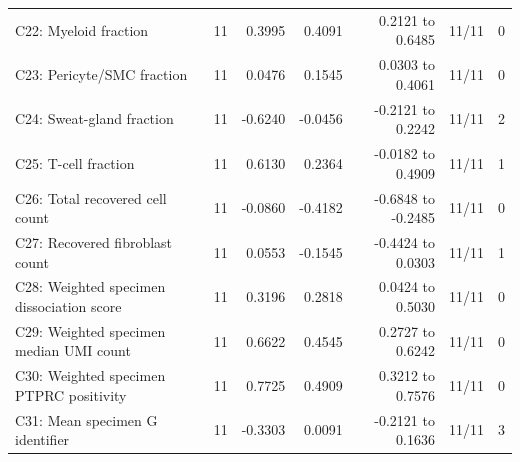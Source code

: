 \documentclass[10pt,a4paper]{article}
\begin{document}
{{\begin{longtable}{@{}p{.29\linewidth}rrrrrr@{}}
C22: Myeloid fraction & 11 & 0.3995 & 0.4091 & 0.2121 to 0.6485 & 11/11 & 0 \\
C23: Pericyte/SMC fraction & 11 & 0.0476 & 0.1545 & 0.0303 to 0.4061 & 11/11 & 0 \\
C24: Sweat-gland fraction & 11 & -0.6240 & -0.0456 & -0.2121 to 0.2242 & 11/11 & 2 \\
C25: T-cell fraction & 11 & 0.6130 & 0.2364 & -0.0182 to 0.4909 & 11/11 & 1 \\
C26: Total recovered cell count & 11 & -0.0860 & -0.4182 & -0.6848 to -0.2485 & 11/11 & 0 \\
C27: Recovered fibroblast count & 11 & 0.0553 & -0.1545 & -0.4424 to 0.0303 & 11/11 & 1 \\
C28: Weighted specimen dissociation score & 11 & 0.3196 & 0.2818 & 0.0424 to 0.5030 & 11/11 & 0 \\
C29: Weighted specimen median UMI count & 11 & 0.6622 & 0.4545 & 0.2727 to 0.6242 & 11/11 & 0 \\
C30: Weighted specimen PTPRC positivity & 11 & 0.7725 & 0.4909 & 0.3212 to 0.7576 & 11/11 & 0 \\
C31: Mean specimen G identifier & 11 & -0.3303 & 0.0091 & -0.2121 to 0.1636 & 11/11 & 3 \\
\end{longtable}
}

}
\end{document}
